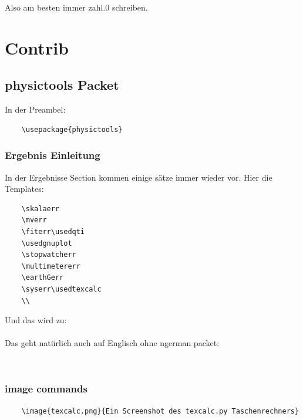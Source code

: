 \documentclass[a4paper]{article}
\begin{document}
Also am besten immer zahl.0 schreiben.

\section{Contrib}

\subsection{physictools Packet}

In der Preambel:

\begin{verbatim}
	\usepackage{physictools}
\end{verbatim}

\subsubsection{Ergebnis Einleitung}

In der Ergebnisse Section kommen einige sätze immer wieder vor. Hier die Templates:

\begin{verbatim}
	\skalaerr
	\mverr
	\fiterr\usedqti
	\usedgnuplot
	\stopwatcherr
	\multimetererr
	\earthGerr
	\syserr\usedtexcalc
	\\
\end{verbatim}


Und das wird zu: \\

\skalaerr
\mverr
\fiterr\usedqti
\usedgnuplot
\stopwatcherr
\multimetererr
\earthGerr
\syserr\usedtexcalc
\\

Das geht natürlich auch auf Englisch ohne ngerman packet: \\


\skalaerr
\mverr
\fiterr\usedqti
\usedgnuplot
\stopwatcherr
\multimetererr
\earthGerr
\syserr\usedtexcalc
\\


\subsubsection{image commands}

\begin{verbatim}
	\image{texcalc.png}{Ein Screenshot des texcalc.py Taschenrechners}
\end{verbatim}
\end{document}
